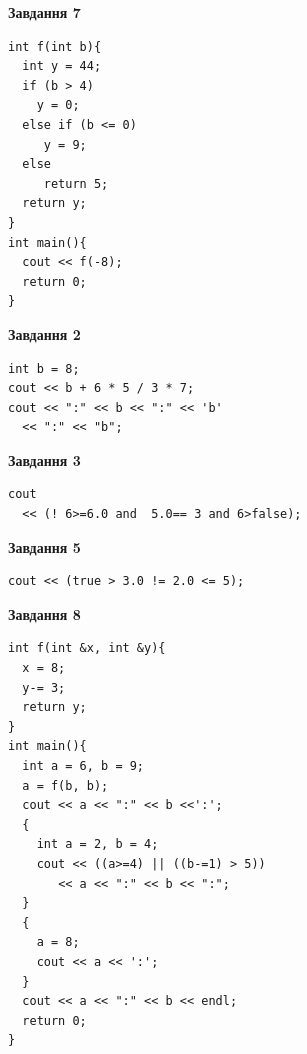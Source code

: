 \documentclass[12pt, ukrainian]{article}
\begin{document}
{\begin {large}
\begin{minipage}[t]{7.0cm}
\begin{center}
\textbf{Завдання 7}
\end{center}
\vspace{-8mm}

\begin{verbatim}
int f(int b){
  int y = 44;
  if (b > 4)
    y = 0;
  else if (b <= 0)
     y = 9;
  else
     return 5;
  return y;
}
int main(){
  cout << f(-8);
  return 0;
}
\end{verbatim}

\end{minipage}
\vline \hspace{1mm}
\begin{minipage}[t]{11.0cm}

\begin{center}
\textbf{Завдання 2}
\end{center}
\vspace{-8mm}

\begin{verbatim}
int b = 8;
cout << b + 6 * 5 / 3 * 7;
cout << ":" << b << ":" << 'b' 
  << ":" << "b";
\end{verbatim}



\begin{center}
\textbf{Завдання 3}
\end{center}
\vspace{-8mm}

\begin{verbatim}
cout 
  << (! 6>=6.0 and  5.0== 3 and 6>false);
\end{verbatim}



\begin{center}
\textbf{Завдання 5}
\end{center}
\vspace{-8mm}

\begin{verbatim}
cout << (true > 3.0 != 2.0 <= 5);
\end{verbatim}



\begin{center}
\textbf{Завдання 8}
\end{center}
\vspace{-8mm}

\begin{verbatim}
int f(int &x, int &y){
  x = 8;
  y-= 3;
  return y;
}
int main(){
  int a = 6, b = 9;
  a = f(b, b);
  cout << a << ":" << b <<':';
  {
    int a = 2, b = 4;
    cout << ((a>=4) || ((b-=1) > 5))
       << a << ":" << b << ":";
  }
  {
    a = 8;
    cout << a << ':';
  }
  cout << a << ":" << b << endl;
  return 0;
}
\end{verbatim}


\end{minipage}
\end{large}}
\end{document}
